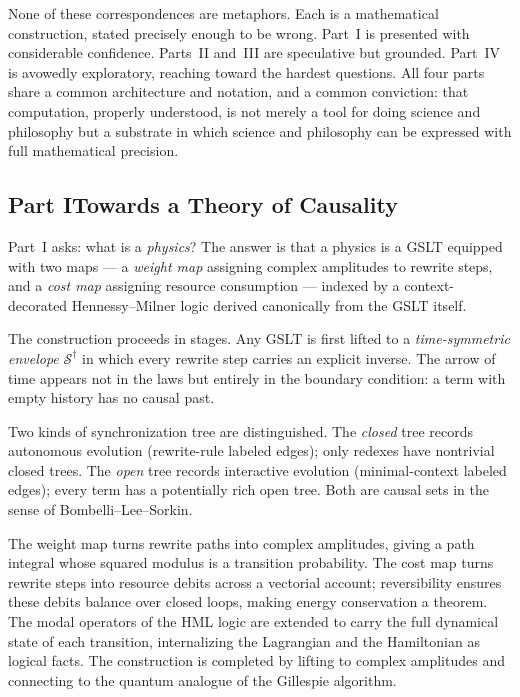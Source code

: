 \documentclass[12pt,openright,twoside]{book}
\theoremstyle{remark}
\newcommand{\GSLT}{\mathcal{S}}
\begin{document}
None of these correspondences are metaphors.
Each is a mathematical construction, stated precisely enough to
be wrong.
Part~I is presented with considerable confidence.
Parts~II and~III are speculative but grounded.
Part~IV is avowedly exploratory, reaching toward the hardest
questions.
All four parts share a common architecture and notation, and a
common conviction: that computation, properly understood, is not
merely a tool for doing science and philosophy but a substrate
in which science and philosophy can be expressed with full
mathematical precision.

\bigskip

\subsection*{Part I\quad Towards a Theory of Causality}

Part~I asks: what is a \emph{physics}?
The answer is that a physics is a GSLT equipped with two maps ---
a \emph{weight map} assigning complex amplitudes to rewrite steps,
and a \emph{cost map} assigning resource consumption --- indexed by
a context-decorated Hennessy--Milner logic derived canonically from
the GSLT itself.

The construction proceeds in stages.
Any GSLT is first lifted to a \emph{time-symmetric envelope}
$\GSLT^\dagger$ in which every rewrite step carries an explicit
inverse.
The arrow of time appears not in the laws but entirely in the
boundary condition: a term with empty history has no causal past.

Two kinds of synchronization tree are distinguished.
The \emph{closed} tree records autonomous evolution (rewrite-rule
labeled edges); only redexes have nontrivial closed trees.
The \emph{open} tree records interactive evolution (minimal-context
labeled edges); every term has a potentially rich open tree.
Both are causal sets in the sense of Bombelli--Lee--Sorkin.

The weight map turns rewrite paths into complex amplitudes,
giving a path integral whose squared modulus is a transition
probability.
The cost map turns rewrite steps into resource debits across a
vectorial account; reversibility ensures these debits balance
over closed loops, making energy conservation a theorem.
The modal operators of the HML logic are extended to carry the full
dynamical state of each transition, internalizing the Lagrangian
and the Hamiltonian as logical facts.
The construction is completed by lifting to complex amplitudes and
connecting to the quantum analogue of the Gillespie algorithm.
\end{document}
